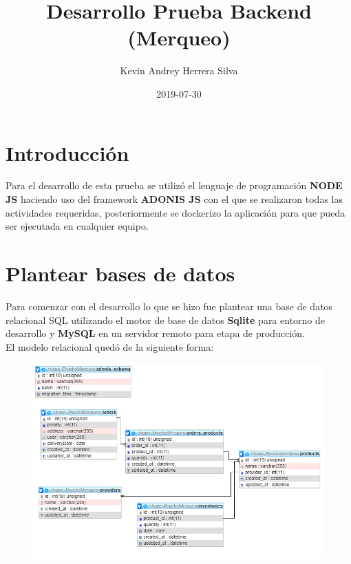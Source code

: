 \documentclass{article}
\title{Desarrollo Prueba Backend (Merqueo) }
\author{Kevin Andrey Herrera Silva}
\date{2019-07-30}
\begin{document}
\maketitle

\section{Introducción}
Para el desarrollo de esta prueba se utilizó el lenguaje de programación \textbf{NODE JS} haciendo uso del framework \textbf{ADONIS JS} con el que se realizaron todas las actividades requeridas, posteriormente se dockerizo la aplicación para que pueda ser ejecutada en cualquier equipo.

\section{Plantear bases de datos}
Para comenzar con el desarrollo lo que se hizo fue plantear una base de datos relacional SQL utilizando el motor de base de datos \textbf{Sqlite} para entorno de desarrollo y \textbf{MySQL} en un servidor remoto para etapa de producción.\\
El modelo relacional quedó de la siguiente forma:

\begin{figure}[h!]
\centering
\includegraphics[scale=0.6]{BD.png}
\end{figure}
\end{document}
